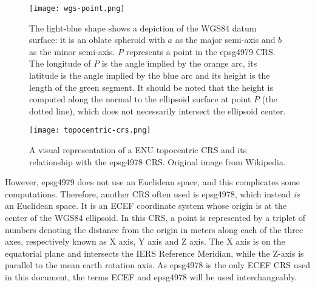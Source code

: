 \begin{figure}
  \centering
  \texttt{[image: wgs-point.png]}
  \caption{The light-blue shape shows a depiction of the WGS84 datum surface: it is an oblate spheroid with $a$ as the major semi-axis and $b$ as the minor semi-axis. $P$ represents a point in the \gls{epsg4979} \gls{CRS}. The longitude of $P$ is the angle implied by the orange arc, its latitude is the angle implied by the blue arc and its height is the length of the green segment. It should be noted that the height is computed along the normal to the ellipsoid surface at point $P$ (the dotted line), which does not necessarily intersect the ellipsoid center.}\label{fig:epsg4979_example_point.png}
\end{figure}

\begin{figure}
  \centering
  \texttt{[image: topocentric-crs.png]}
  \caption{A visual representation of a \gls{ENU} topocentric \gls{CRS} and its relationship with the \gls{epsg4978} \gls{CRS}. Original image from Wikipedia\cite{noauthor_local_2022}.}\label{fig:topocentric_crs_example.png}
\end{figure}

However, \gls{epsg4979} does not use an Euclidean space, and this complicates some computations. Therefore, another \gls{CRS} often used is \gls{epsg4978}, which instead \emph{is} an Euclidean space. It is an \gls{ECEF} coordinate system whose origin is at the center of the WGS84 ellipsoid. In this \gls{CRS}, a point is represented by a triplet of numbers denoting the distance from the origin in meters along each of the three axes, respectively known as X axis, Y axis and Z axis. The X axis is on the equatorial plane and intersects the IERS Reference Meridian, while the Z-axis is parallel to the mean earth rotation axis. As \gls{epsg4978} is the only \gls{ECEF} \gls{CRS} used in this document, the terms \gls{ECEF} and \gls{epsg4978} will be used interchangeably.

